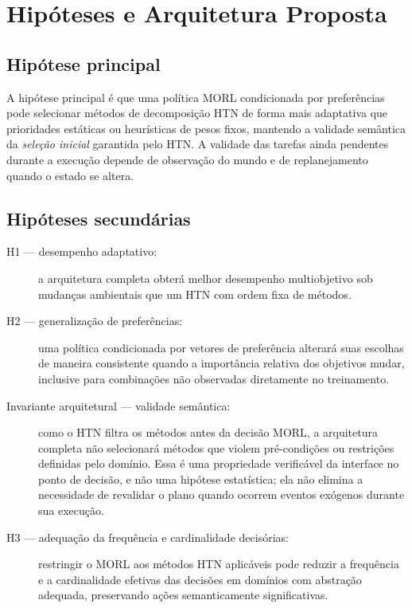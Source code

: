 \chapter{Hipóteses e Arquitetura Proposta}

\section{Hipótese principal}

A hipótese principal é que uma política MORL condicionada por preferências
pode selecionar métodos de decomposição HTN de forma mais adaptativa que
prioridades estáticas ou heurísticas de pesos fixos, mantendo a validade
semântica da \emph{seleção inicial} garantida pelo HTN\@. A validade
das tarefas ainda pendentes durante a execução depende de observação
do mundo e de replanejamento quando o estado se altera.

\section{Hipóteses secundárias}

\begin{description}
\item[H1 --- desempenho adaptativo:] a arquitetura completa obterá melhor
desempenho multiobjetivo sob mudanças ambientais que um HTN com ordem fixa de
métodos.

\item[H2 --- generalização de preferências:] uma política condicionada por
vetores de preferência alterará suas escolhas de maneira consistente quando a
importância relativa dos objetivos mudar, inclusive para combinações não
observadas diretamente no treinamento.

\item[Invariante arquitetural --- validade semântica:] como o HTN filtra os
métodos antes da decisão MORL, a arquitetura completa não selecionará métodos
que violem pré-condições ou restrições definidas pelo domínio.
Essa é uma propriedade verificável da interface no ponto de decisão, e não
uma hipótese estatística; ela não elimina a necessidade de revalidar o plano
quando ocorrem eventos exógenos durante sua execução.

\item[H3 --- adequação da frequência e cardinalidade decisórias:] restringir o
MORL aos métodos HTN aplicáveis pode reduzir a frequência e a cardinalidade
efetivas das decisões em domínios com abstração adequada, preservando ações
semanticamente significativas.

\end{description}

